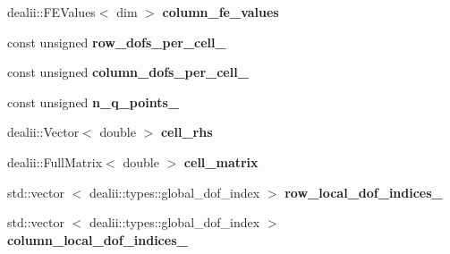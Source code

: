 \begin{DoxyCompactItemize}
\item 
\hypertarget{structSpacy_1_1dealII_1_1Detail_1_1LocalAssemblyBase_aaf9d2501f535b337e2d374b41275d5ae}{dealii\-::\-F\-E\-Values$<$ dim $>$ {\bfseries column\-\_\-fe\-\_\-values}}\label{structSpacy_1_1dealII_1_1Detail_1_1LocalAssemblyBase_aaf9d2501f535b337e2d374b41275d5ae}

\item 
\hypertarget{structSpacy_1_1dealII_1_1Detail_1_1LocalAssemblyBase_a996b6952c0fc08aa7f2817c7a4f2b313}{const unsigned {\bfseries row\-\_\-dofs\-\_\-per\-\_\-cell\-\_\-}}\label{structSpacy_1_1dealII_1_1Detail_1_1LocalAssemblyBase_a996b6952c0fc08aa7f2817c7a4f2b313}

\item 
\hypertarget{structSpacy_1_1dealII_1_1Detail_1_1LocalAssemblyBase_a09cc798555d81b9343a4cfd352b4789f}{const unsigned {\bfseries column\-\_\-dofs\-\_\-per\-\_\-cell\-\_\-}}\label{structSpacy_1_1dealII_1_1Detail_1_1LocalAssemblyBase_a09cc798555d81b9343a4cfd352b4789f}

\item 
\hypertarget{structSpacy_1_1dealII_1_1Detail_1_1LocalAssemblyBase_a009993ec7e3c5e38ca44f2dbd160a280}{const unsigned {\bfseries n\-\_\-q\-\_\-points\-\_\-}}\label{structSpacy_1_1dealII_1_1Detail_1_1LocalAssemblyBase_a009993ec7e3c5e38ca44f2dbd160a280}

\item 
\hypertarget{structSpacy_1_1dealII_1_1Detail_1_1LocalAssemblyBase_a407f1e4a2f7d293a61dd295be569d0d2}{dealii\-::\-Vector$<$ double $>$ {\bfseries cell\-\_\-rhs}}\label{structSpacy_1_1dealII_1_1Detail_1_1LocalAssemblyBase_a407f1e4a2f7d293a61dd295be569d0d2}

\item 
\hypertarget{structSpacy_1_1dealII_1_1Detail_1_1LocalAssemblyBase_a4c9f8591abb90e2af136b0c82c3fd973}{dealii\-::\-Full\-Matrix$<$ double $>$ {\bfseries cell\-\_\-matrix}}\label{structSpacy_1_1dealII_1_1Detail_1_1LocalAssemblyBase_a4c9f8591abb90e2af136b0c82c3fd973}

\item 
\hypertarget{structSpacy_1_1dealII_1_1Detail_1_1LocalAssemblyBase_a07f3065dbebecd404259ed7a374544a5}{std\-::vector\*
$<$ dealii\-::types\-::global\-\_\-dof\-\_\-index $>$ {\bfseries row\-\_\-local\-\_\-dof\-\_\-indices\-\_\-}}\label{structSpacy_1_1dealII_1_1Detail_1_1LocalAssemblyBase_a07f3065dbebecd404259ed7a374544a5}

\item 
\hypertarget{structSpacy_1_1dealII_1_1Detail_1_1LocalAssemblyBase_aa9aee3575f199c88d3414b4f7e53cb26}{std\-::vector\*
$<$ dealii\-::types\-::global\-\_\-dof\-\_\-index $>$ {\bfseries column\-\_\-local\-\_\-dof\-\_\-indices\-\_\-}}\label{structSpacy_1_1dealII_1_1Detail_1_1LocalAssemblyBase_aa9aee3575f199c88d3414b4f7e53cb26}

\end{DoxyCompactItemize}
